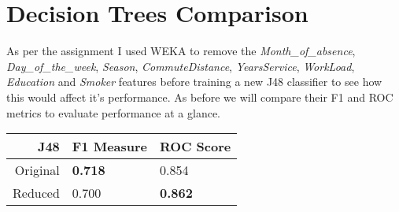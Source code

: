 \section{Decision Trees Comparison}

As per the assignment I used WEKA to remove the \textit{Month\_of\_absence}, \textit{Day\_of\_the\_week}, \textit{Season}, \textit{CommuteDistance}, \textit{YearsService}, \textit{WorkLoad}, \textit{Education} and  \textit{Smoker} features before training a new J48 classifier to see how this would affect it's performance. As before we will compare their F1 and ROC metrics to evaluate performance at a glance. 

\begin{tabular}{|r|l|l|}
\hline 
J48 & F1 Measure & ROC Score \\ 
\hline 
Original & \textbf{0.718} & 0.854 \\ 
\hline 
Reduced & 0.700 & \textbf{0.862} \\ 
\hline 
\end{tabular} 
